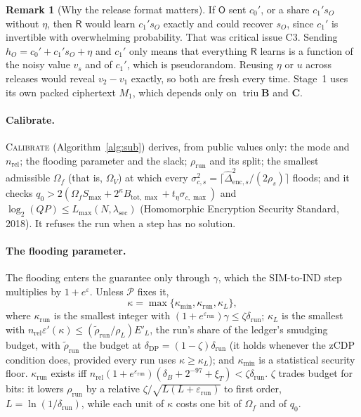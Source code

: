 \documentclass[11pt]{article}
\theoremstyle{definition}
\newtheorem{remark}{Remark}
\theoremstyle{plain}
\newcommand{\Rp}{\mathsf{R}}
\newcommand{\Op}{\mathsf{O}}
\newcommand{\bB}{\mathbf{B}}
\newcommand{\bC}{\mathbf{C}}
\DeclareMathOperator{\triu}{triu}
\begin{document}
\begin{remark}[Why the release format matters]
If $\Op$ sent $c_0'$, or a share $c_1's_O$ without $\eta$, then $\Rp$ would learn $c_1's_O$ exactly and could recover $s_O$, since $c_1'$ is invertible with overwhelming probability. That was critical issue C3. Sending $h_O=c_0'+c_1's_O+\eta$ and $c_1'$ only means that everything $\Rp$ learns is a function of the noisy value $v_s$ and of $c_1'$, which is pseudorandom. Reusing $\eta$ or $u$ across releases would reveal $v_2-v_1$ exactly, so both are fresh every time. Stage~1 uses its own packed ciphertext $M_1$, which depends only on $\triu\bB$ and $\bC$.
\end{remark}

\paragraph{Calibrate.} \textsc{Calibrate} (Algorithm~\ref{alg:sub}) derives, from public values only: the mode and $n_{\mathrm{rel}}$; the flooding parameter and the slack; $\rho_{\mathrm{run}}$ and its split; the smallest admissible $\Omega_f$ (that is, $\Omega_V$) at which every $\sigma_{c,s}^2=\lceil\widehat\Delta_{\mathrm{enc},s}^2/(2\rho_s)\rceil$ floods; and it checks $q_0>2(\Omega_fS_{\max}+2^{\kappa}B_{\mathrm{tot},\max}+t_\eta\sigma_{c,\max})$ and $\log_2(QP)\le L_{\max}(N,\lambda_{\mathrm{sec}})$ (Homomorphic Encryption Security Standard, 2018). It refuses the run when a step has no solution.

\paragraph{The flooding parameter.} The flooding enters the guarantee only through $\gamma$, which the SIM-to-IND step multiplies by $1+e^{\varepsilon}$. Unless $\mathcal P$ fixes it,
\[
  \kappa=\max\{\kappa_{\min},\kappa_{\mathrm{run}},\kappa_L\},
\]
where $\kappa_{\mathrm{run}}$ is the smallest integer with $(1+e^{\varepsilon_{\mathrm{run}}})\gamma\le\zeta\delta_{\mathrm{run}}$; $\kappa_L$ is the smallest with $n_{\mathrm{rel}}\varepsilon'(\kappa)\le(\tilde\rho_{\mathrm{run}}/\rho_L)E'_L$, the run's share of the ledger's smudging budget, with $\tilde\rho_{\mathrm{run}}$ the budget at $\delta_{\mathrm{DP}}=(1-\zeta)\delta_{\mathrm{run}}$ (it holds whenever the zCDP condition does, provided every run uses $\kappa\ge\kappa_L$); and $\kappa_{\min}$ is a statistical security floor. $\kappa_{\mathrm{run}}$ exists iff $n_{\mathrm{rel}}(1+e^{\varepsilon_{\mathrm{run}}})(\delta_B+2^{-97}+\xi_T)<\zeta\delta_{\mathrm{run}}$. $\zeta$ trades budget for bits: it lowers $\rho_{\mathrm{run}}$ by a relative $\zeta/\sqrt{L(L+\varepsilon_{\mathrm{run}})}$ to first order, $L=\ln(1/\delta_{\mathrm{run}})$, while each unit of $\kappa$ costs one bit of $\Omega_f$ and of $q_0$.
\end{document}
